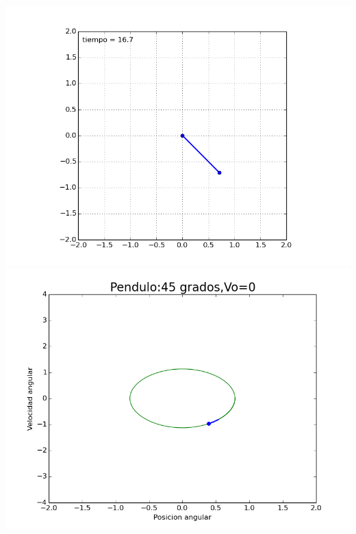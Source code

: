 \documentclass[12pt]{article}
\begin{document}
\begin{center}
\includegraphics[scale=0.5]{45.png}\\
\includegraphics[scale=0.5]{45fase.png}
\end{center}
\end{document}
